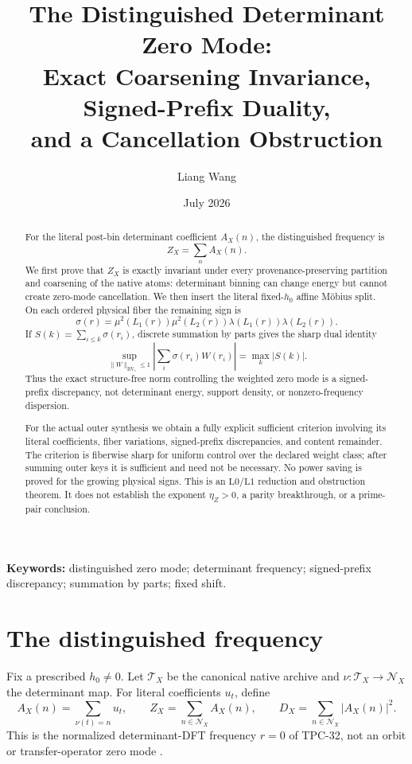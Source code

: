 \documentclass[11pt,a4paper]{article}
\title{\bfseries The Distinguished Determinant Zero Mode:\\
Exact Coarsening Invariance, Signed-Prefix Duality,\\
and a Cancellation Obstruction}
\author{Liang Wang}
\date{July 2026}
\theoremstyle{definition}
\theoremstyle{remark}
\newcommand{\Lzero}{\mathrm{L0}}
\newcommand{\Lone}{\mathrm{L1}}
\newcommand{\cT}{\mathcal T}
\newcommand{\cN}{\mathcal N}
\newcommand{\BV}{\mathrm{BV}_*}
\begin{document}
\maketitle

\begin{abstract}
For the literal post-bin determinant coefficient
\(A_X(n)\), the distinguished frequency is
\[
 Z_X=\sum_nA_X(n).
\]
We first prove that \(Z_X\) is exactly invariant under every
provenance-preserving partition and coarsening of the native atoms:
determinant binning can change energy but cannot create zero-mode
cancellation.  We then insert the literal fixed-\(h_0\) affine
M\"obius split.  On each ordered physical fiber the remaining sign
is
\[
 \sigma(r)=\mu^2(L_1(r))\mu^2(L_2(r))
            \lambda(L_1(r))\lambda(L_2(r)).
\]
If \(S(k)=\sum_{i\le k}\sigma(r_i)\), discrete summation by parts
gives the sharp dual identity
\[
 \sup_{\|W\|_{\BV}\le1}
 \left|\sum_i\sigma(r_i)W(r_i)\right|
 =\max_k|S(k)|.
\]
Thus the exact structure-free norm controlling the weighted zero
mode is a signed-prefix discrepancy, not determinant energy,
support density, or nonzero-frequency dispersion.

For the actual outer synthesis we obtain a fully explicit sufficient
criterion involving its literal coefficients, fiber variations,
signed-prefix discrepancies, and content remainder.  The criterion
is fiberwise sharp for uniform control over the declared weight
class; after summing outer keys it is sufficient and need not be
necessary.  No
power saving is proved for the growing physical signs.  This is an
\(\Lzero/\Lone\) reduction and obstruction theorem.  It does not
establish the exponent \(\eta_Z>0\), a parity breakthrough, or a
prime-pair conclusion.
\end{abstract}

\medskip
\noindent\textbf{Keywords:} distinguished zero mode; determinant
frequency; signed-prefix discrepancy; summation by parts; fixed shift.

\section{The distinguished frequency}

Fix a prescribed \(h_0\ne0\).  Let \(\cT_X\) be the canonical native
archive and \(\nu:\cT_X\to\cN_X\) the determinant map.  For literal
coefficients \(u_t\), define
\[
 A_X(n)=\sum_{\nu(t)=n}u_t,\qquad
 Z_X=\sum_{n\in\cN_X}A_X(n),\qquad
 D_X=\sum_{n\in\cN_X}|A_X(n)|^2.
\]
This is the normalized determinant-DFT frequency \(r=0\) of
TPC-32, not an orbit or transfer-operator zero mode
\citep{WangTPC32,WangTPC81}.
\end{document}

